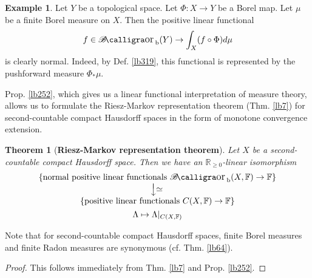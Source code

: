 \documentclass[12pt,b5paper,notitlepage]{article}
\theoremstyle{definition}
\newtheorem{eg}[df]{Example}
\theoremstyle{plain}
\newtheorem{thm}[df]{Theorem}
\DeclareMathOperator{\Borb}{{\mathscr{B}\text{\kern -2pt {\calligra\large or}}\,}_{\mathrm b}}
\newcommand{\Rbb}{\mathbb R}
\newcommand{\Fbb}{\mathbb F}
\numberwithin{equation}{section}
\begin{document}
\begin{eg}\label{lb318}
Let $Y$ be a topological space. Let $\Phi:X\rightarrow Y$ be a Borel map. Let $\mu$ be a finite Borel measure on $X$. Then the positive linear functional
\begin{align*}
f\in\Borb(Y)\rightarrow \int_X (f\circ\Phi)d\mu
\end{align*}
is clearly normal. Indeed, by Def. \ref{lb319}, this functional is represented by the pushforward measure $\Phi_*\mu$.
\end{eg}


Prop. \ref{lb252}, which gives us a linear functional interpretation of measure theory, allows us to formulate the Riesz-Markov representation theorem (Thm. \ref{lb7}) for second-countable compact Hausdorff spaces in the form of monotone convergence extension.


\begin{thm}[\textbf{Riesz-Markov representation theorem}]\label{lb253} 
Let $X$ be a second-countable compact Hausdorff space. Then we have an $\Rbb_{\geq0}$-linear isomorphism
\begin{gather}
\begin{gathered}
\begin{array}{c}
\{\text{normal positive linear functionals $\Borb(X,\Fbb)\rightarrow\Fbb$}\}\\
\raisebox{0.3cm}{\rotatebox{-90}{$\xlongrightarrow{\rotatebox{90}{$\simeq$}}$}}\\
\{\text{positive linear functionals $C(X,\Fbb)\rightarrow\Fbb$}\}
\end{array}
\\
\Lambda\mapsto\Lambda|_{C(X,\Fbb)}
\end{gathered}
\end{gather}
\end{thm} 

Note that for second-countable compact Hausdorff spaces, finite Borel measures and finite Radon measures are synonymous (cf. Thm. \ref{lb64}).

\begin{proof}
This follows immediately from Thm. \ref{lb7} and Prop. \ref{lb252}.
\end{proof}
\end{document}
